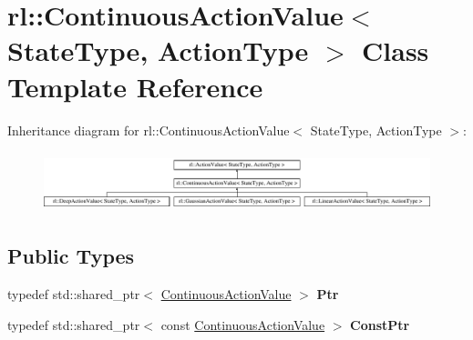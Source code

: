 \hypertarget{classrl_1_1_continuous_action_value}{}\section{rl\+:\+:Continuous\+Action\+Value$<$ State\+Type, Action\+Type $>$ Class Template Reference}
\label{classrl_1_1_continuous_action_value}
Inheritance diagram for rl\+:\+:Continuous\+Action\+Value$<$ State\+Type, Action\+Type $>$\+:\begin{figure}[H]
\begin{center}
\leavevmode
\includegraphics[height=1.755486cm]{classrl_1_1_continuous_action_value}
\end{center}
\end{figure}
\subsection*{Public Types}
\begin{DoxyCompactItemize}
\item 
\hypertarget{classrl_1_1_continuous_action_value_a2e736bf645ad40c3f15ba4da245d6193}{}\label{classrl_1_1_continuous_action_value_a2e736bf645ad40c3f15ba4da245d6193} 
typedef std\+::shared\+\_\+ptr$<$ \hyperlink{classrl_1_1_continuous_action_value}{Continuous\+Action\+Value} $>$ {\bfseries Ptr}
\item 
\hypertarget{classrl_1_1_continuous_action_value_af9004ef834679e18cc0edd277aa65010}{}\label{classrl_1_1_continuous_action_value_af9004ef834679e18cc0edd277aa65010} 
typedef std\+::shared\+\_\+ptr$<$ const \hyperlink{classrl_1_1_continuous_action_value}{Continuous\+Action\+Value} $>$ {\bfseries Const\+Ptr}
\end{DoxyCompactItemize}
